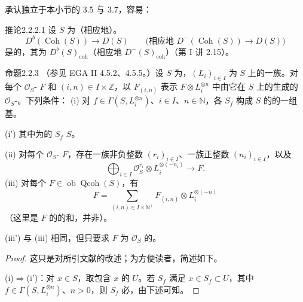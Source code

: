 承认独立于本小节的 3.5 与 3.7，容易：
\begin{SGAresult}{推论}{2.2.2.1}
设 $S$ 为（相应地）。
\[
D^b(\operatorname{Coh}(S))\longrightarrow D(S)
\qquad\bigl(\text{相应地 }D^-(\operatorname{Coh}(S))\longrightarrow D(S)\bigr)
\]
是的，其为 $D^b(S)_{\mathrm{coh}}$（相应地 $D^-(S)_{\mathrm{coh}}$）（第 I 讲 2.15）。
\end{SGAresult}
\begin{SGAresult}{命题}{2.2.3}
（参见 EGA II 4.5.2、4.5.5。）设 $S$ 为，$(L_i)_{i\in I}$ 为 $S$ 上的一族。对每个 $\mathcal O_S$- $F$ 和 $(i,n)\in I\times\mathbb Z$，以 $F_{(i,n)}$ 表示 $F\otimes L_i^{\otimes n}$ 中由它在 $S$ 上的生成的 $\mathcal O_S$-。下列条件：
(i) 对 $f\in\Gamma(S,L_i^{\otimes n})$、$i\in I$、$n\in\mathbb N$，各 $S_f$ 构成 $S$ 的的一组基。

(i') 其中为的 $S_f$  $S$。

(ii) 对每个 $\mathcal O_S$- $F$，存在一族非负整数 $(r_i)_{i\in I}$、一族正整数 $(n_i)_{i\in I}$，以及
\[
\bigoplus_{i\in I}\mathcal O_S^{r_i}\otimes L_i^{\otimes(-n_i)}\longrightarrow F.
\]
(iii) 对每个 $F\in\operatorname{ob}\operatorname{Qcoh}(S)$，有
\[
F=\sum_{(i,n)\in I\times\mathbb N^+}F_{(i,n)}\otimes L_i^{\otimes(-n)}
\]
（这里是 $F$ 的的和，并非）。

(iii') 与 (iii) 相同，但只要求 $F$ 为 $\mathcal O_S$ 的。
\end{SGAresult}
\begin{proof}
这只是对所引文献的改述；为方便读者，简述如下。

(i)$\Rightarrow$(i')：对 $x\in S$，取包含 $x$ 的 $U$。若 $S_f$ 满足 $x\in S_f\subset U$，其中 $f\in\Gamma(S,L_i^{\otimes n})$、$n>0$，则 $S_f$ 必，由下述可知。
\end{proof}
